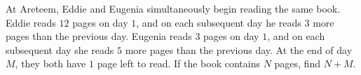 At Areteem, Eddie and Eugenia simultaneously begin reading the same book. Eddie reads $12$ pages on day $1$, and on each subsequent day he reads $3$ more pages than the previous day. Eugenia reads $3$ pages on day $1$, and on each subsequent day she reads $5$ more pages than the previous day. At the end of day $M$, they both have $1$ page left to read. If the book contains $N$ pages, find $N+M$.
